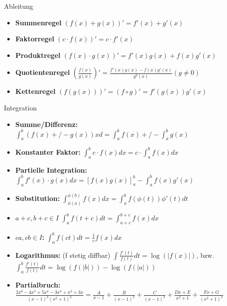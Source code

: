 \begin{Rechenregeln}{Ableitung}{}
    \begin{itemize}
        \item \textbf{Summenregel} $(f(x)+g(x))' = f'(x) + g'(x)$
        \item \textbf{Faktorregel} $(c\cdot f(x))' = c\cdot f'(x)$
        \item \textbf{Produktregel} $(f(x)\cdot g(x))' = f'(x)g(x) + f(x)g'(x)$
        \item \textbf{Quotientenregel} $\left(\frac{f(x)}{g(x)}\right)' = \frac{f'(x)g(x) - f(x)g'(x)}{g^2(x)}(g\neq 0)$
        \item \textbf{Kettenregel} $(f(g(x)))' = (f\circ g)' = f'(g(x))g'(x)$
    \end{itemize}
\end{Rechenregeln}

\begin{Rechenregeln}{Integration}{}
    \begin{itemize}
    \item \textbf{Summe/Differenz:} $\int_a^b (f(x) +/- g(x)) xd = \int_a^b f(x) +/- \int_a^b g(x)$
    \item \textbf{Konstanter Faktor:} $\int_a^b c\cdot f(x)dx = c\cdot \int_a^b f(x)dx$
    \item \textbf{Partielle Integration:} $\int_a^b f'(x)\cdot g(x)dx = \left[f(x)g(x)\right]_a^b - \int_a^b f(x)g'(x)$
    \item \textbf{Substitution:} $\int_{\phi(a)}^{\phi(b)} f(x)dx = \int_a^b f(\phi(t))\phi '(t) dt$
    \item \textbf{$a+c, b+c \in I$} $\int_a^b f(t+c)dt = \int_{a+c}^{b+c} f(x)dx$
    \item \textbf{$ca,cb\in I$: } $\int_a^b f(ct)dt = \frac{1}{c}f(x)dx$
    \item \textbf{Logarithmus: }\;(f stetig diffbar) $\int\frac{f'(t)}{f(t)}dt = \log(|f(x)|)$, bzw. $\int_a^b\frac{f'(t)}{f(t)}dt = \log(f(|b|)) - \log(f(|a|))$
    \item \textbf{Partialbruch: }\\
     $\frac{2x^6-4x^5+5x^4-3x^3+x^2+3x}{(x-1)^3(x^2+1)^2} = \frac{A}{x-1}+\frac{B}{(x-1)^2}+\frac{C}{(x-1)^3}+\frac{Dx+E}{x^2+1}+\frac{Fx+G}{(x^2+1)^2}$
    \end{itemize}
\end{Rechenregeln}

